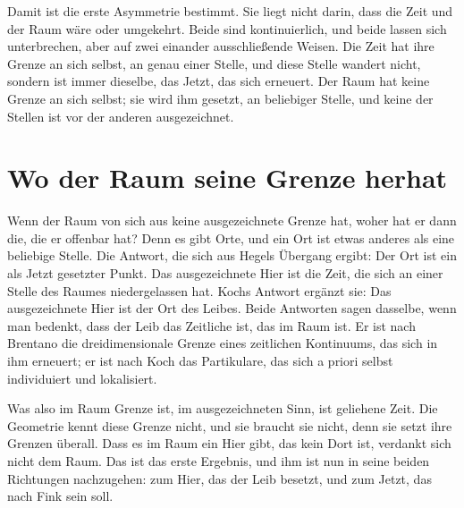 Damit ist die erste Asymmetrie bestimmt. Sie liegt nicht darin, dass die Zeit  und der Raum  wäre oder umgekehrt. Beide sind kontinuierlich, und beide lassen sich unterbrechen, aber auf zwei einander ausschließende Weisen. Die Zeit hat ihre Grenze an sich selbst, an genau einer Stelle, und diese Stelle wandert nicht, sondern ist immer dieselbe, das Jetzt, das sich erneuert. Der Raum hat keine Grenze an sich selbst; sie wird ihm gesetzt, an beliebiger Stelle, und keine der Stellen ist vor der anderen ausgezeichnet.

\section{Wo der Raum seine Grenze herhat}

Wenn der Raum von sich aus keine ausgezeichnete Grenze hat, woher hat er dann die, die er offenbar hat? Denn es gibt Orte, und ein Ort ist etwas anderes als eine beliebige Stelle. Die Antwort, die sich aus Hegels Übergang ergibt: Der Ort ist ein als Jetzt gesetzter Punkt. Das ausgezeichnete Hier ist die Zeit, die sich an einer Stelle des Raumes niedergelassen hat. Kochs Antwort ergänzt sie: Das ausgezeichnete Hier ist der Ort des Leibes. Beide Antworten sagen dasselbe, wenn man bedenkt, dass der Leib das Zeitliche ist, das im Raum ist. Er ist nach Brentano die dreidimensionale Grenze eines zeitlichen Kontinuums, das sich in ihm erneuert; er ist nach Koch das Partikulare, das sich a priori selbst individuiert und lokalisiert.

Was also im Raum Grenze ist, im ausgezeichneten Sinn, ist geliehene Zeit. Die Geometrie kennt diese Grenze nicht, und sie braucht sie nicht, denn sie setzt ihre Grenzen überall. Dass es im Raum ein Hier gibt, das kein Dort ist, verdankt sich nicht dem Raum. Das ist das erste Ergebnis, und ihm ist nun in seine beiden Richtungen nachzugehen: zum Hier, das der Leib besetzt, und zum Jetzt, das nach Fink  sein soll.
